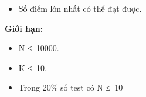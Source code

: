 \begin{itemize}
	\item     Số điểm lớn nhất có thể đạt được.   
\end{itemize}

\textbf{    Giới hạn:   }
\begin{itemize}
	\item     N ≤ 10000.   
	\item     K ≤ 10.   
	\item     Trong 20\% số test có N ≤ 10   
\end{itemize}
